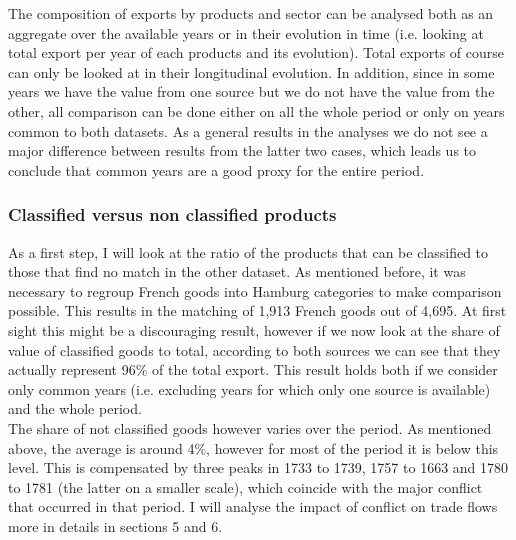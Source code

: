 \documentclass[12pt,a4paper,titlepage,english]{article}
\begin{document}
The composition of exports by products and sector can be analysed both as an aggregate over the available years or in their evolution in time (i.e. looking at total export per year of each products and its evolution). Total exports of course can only be looked at in their longitudinal evolution. In addition, since in some years we have the value from one source but we do not have the value from the other, all comparison can be done either on all the whole period or only on years common to both datasets. As a general results in the analyses we do not see a major difference between results from the latter two cases, which leads us to conclude that common years are a good proxy for the entire period. 

\subsubsection{Classified versus non classified products}
As a first step, I will look at the ratio of the products that can be classified to those that find no match in the other dataset. As mentioned before, it was necessary to regroup French goods into Hamburg categories to make comparison possible. This results in the matching of 1,913 French goods out of 4,695. At first sight this might be a discouraging result, however if we now look at the share of value of classified goods to total, according to both sources we can see that they actually represent 96\% of the total export. This result holds both if we consider only common years (i.e. excluding years for which only one source is available) and the whole period. \\
The share of not classified goods however varies over the period. As mentioned above, the average is around 4\%, however for most of the period it is below this level. This is compensated by three peaks in 1733 to 1739, 1757 to 1663 and 1780 to 1781 (the latter on a smaller scale), which coincide with the major conflict that occurred in that period. I will analyse the impact of conflict on trade flows more in details in sections 5 and 6.
\end{document}
